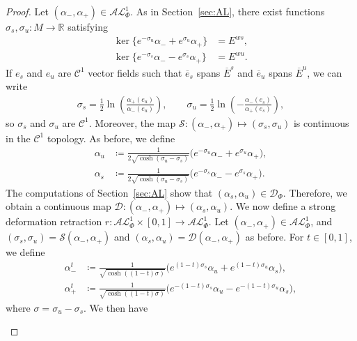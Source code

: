 \documentclass[letterpaper, 11pt]{article}
\numberwithin{equation}{section}
\newcommand{\R}{\mathbb{R}}
\begin{document}
\begin{proof}
Let $(\alpha_-, \alpha_+) \in \mathcal{AL}^1_\Phi$. As in Section~\ref{sec:AL}, there exist functions $\sigma_s, \sigma_u : M \rightarrow \R$ satisfying
\begin{align*}
    \ker\big\{e^{-\sigma_u} \alpha_- + e^{\sigma_u} \alpha_+ \big\} &= E^{ws}, \\
    \ker\big\{e^{-\sigma_s} \alpha_- -e^{\sigma_s} \alpha_+\big\} &= E^{wu}.
\end{align*}
If $e_s$ and $e_u$ are $\mathcal{C}^1$ vector fields such that $\overline{e}_s$ spans $\overline{E}^s$ and $\overline{e}_u$ spans $\overline{E}^u$, we can write
\begin{align*}
\sigma_s = \frac{1}{2} \ln \left(  \frac{\alpha_+(e_u)}{\alpha_-(e_u)} \right), \qquad \sigma_u = \frac{1}{2} \ln \left( - \frac{\alpha_-(e_s)}{\alpha_+(e_s)} \right), 
\end{align*}
so $\sigma_s$ and $\sigma_u$ are $\mathcal{C}^1$. Moreover, the map $\mathcal{S}: (\alpha_-, \alpha_+) \mapsto (\sigma_s, \sigma_u)$ is continuous in the $\mathcal{C}^1$ topology. As before, we define
\begin{align*}
    \alpha_u &\coloneqq \frac{1}{2 \sqrt{\cosh(\sigma_u - \sigma_s)}} \big(e^{-\sigma_u} \alpha_- + e^{\sigma_u} \alpha_+ \big), \\
    \alpha_s &\coloneqq \frac{1}{2 \sqrt{\cosh(\sigma_u - \sigma_s)}} \big(e^{-\sigma_s} \alpha_- -e^{\sigma_s} \alpha_+\big).
\end{align*}
The computations of Section~\ref{sec:AL} show that $(\alpha_s, \alpha_u) \in \mathcal{D}_\Phi$. Therefore, we obtain a continuous map $\mathcal{D}: (\alpha_-, \alpha_+) \mapsto (\alpha_s, \alpha_u)$. We now define a strong deformation retraction $r : \mathcal{AL}^1_\Phi \times [0,1] \rightarrow \mathcal{AL}^1_\Phi$. Let $(\alpha_-, \alpha_+) \in \mathcal{AL}^1_\Phi $, and $(\sigma_s, \sigma_u) = \mathcal{S}(\alpha_-, \alpha_+)$ and $(\alpha_s, \alpha_u) = \mathcal{D} (\alpha_-, \alpha_+)$ as before. For $t \in [0,1]$, we define
\begin{align*}
    \alpha^t_- &\coloneqq \frac{1}{\sqrt{\cosh((1-t)\sigma)}}\big(e^{(1-t)\sigma_s} \alpha_u + e^{(1-t)\sigma_u} \alpha_s\big), \\
    \alpha^t_+ &\coloneqq \frac{1}{\sqrt{\cosh((1-t)\sigma)}}\big(e^{-(1-t)\sigma_s} \alpha_u - e^{-(1-t)\sigma_u} \alpha_s\big),
\end{align*}
where $\sigma = \sigma_u - \sigma_s$. We then have
\begin{itemize}

\end{itemize}
\end{proof}
\end{document}

